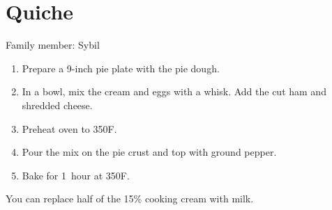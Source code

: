 \chapter{Quiche}
\label{ch:hamquiche}



Family member: Sybil

\begin{enumerate}
    \item Prepare a 9-inch pie plate with the pie dough.
    \item In a bowl, mix the cream and eggs with a whisk. Add the cut ham and shredded cheese.
    \item Preheat oven to 350\degree F.
    \item Pour the mix on the pie crust and top with ground pepper.
    \item Bake for 1~hour at 350\degree F.
\end{enumerate}

You can replace half of the 15\% cooking cream with milk.
